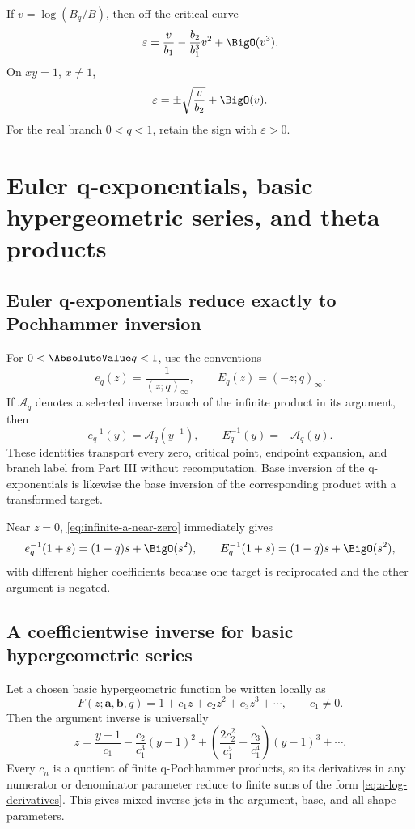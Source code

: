 \documentclass[11pt,letterpaper,oneside,openany]{book}
\theoremstyle{definition}
\theoremstyle{remark}
\newcommand{\Aq}{\mathcal A_q}
\begin{document}
If \(v=\log(B_q/B)\), then off the critical curve
\[
 \varepsilon=\frac{v}{b_1}-\frac{b_2}{b_1^3}v^2+\BigO(v^3).
\]
On \(xy=1\), \(x\ne1\),
\[
 \varepsilon=\pm\sqrt{\frac{v}{b_2}}+\BigO(v).
\]
For the real branch \(0<q<1\), retain the sign with \(\varepsilon>0\).

\chapter{Euler q-exponentials, basic hypergeometric series, and theta products}

\section{Euler q-exponentials reduce exactly to Pochhammer inversion}
For \(0<\AbsoluteValue q<1\), use the conventions
\[
 e_q(z)=\frac1{(z;q)_\infty},
 \qquad
 E_q(z)=(-z;q)_\infty.
\]
If \(\Aq\) denotes a selected inverse branch of the infinite product in its
argument, then
\begin{equation}
 e_q^{-1}(y)=\Aq(y^{-1}),
 \qquad
 E_q^{-1}(y)=-\Aq(y).
 \label{eq:qexp-exact-inverse}
\end{equation}
These identities transport every zero, critical point, endpoint expansion,
and branch label from Part III without recomputation.  Base inversion of the
q-exponentials is likewise the base inversion of the corresponding product
with a transformed target.

Near \(z=0\), \cref{eq:infinite-a-near-zero} immediately gives
\[
 e_q^{-1}(1+s)=(1-q)s+\BigO(s^2),
 \qquad
 E_q^{-1}(1+s)=(1-q)s+\BigO(s^2),
\]
with different higher coefficients because one target is reciprocated and the
other argument is negated.

\section{A coefficientwise inverse for basic hypergeometric series}
Let a chosen basic hypergeometric function be written locally as
\[
 F(z;\bm a,\bm b,q)=1+c_1z+c_2z^2+c_3z^3+\cdots,
 \qquad c_1\ne0.
\]
Then the argument inverse is universally
\begin{equation}
 z=\frac{y-1}{c_1}-\frac{c_2}{c_1^3}(y-1)^2
 +\left(\frac{2c_2^2}{c_1^5}-\frac{c_3}{c_1^4}\right)(y-1)^3+\cdots.
 \label{eq:basic-hypergeometric-zinverse}
\end{equation}
Every \(c_n\) is a quotient of finite q-Pochhammer products, so its derivatives
in any numerator or denominator parameter reduce to finite sums of the form
\cref{eq:a-log-derivatives}.  This gives mixed inverse jets in the argument,
base, and all shape parameters.
\end{document}

